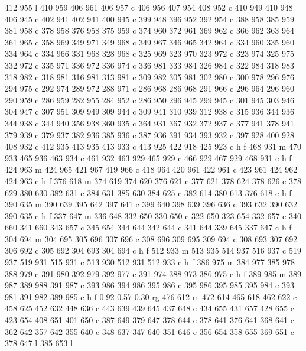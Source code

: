 {{   412 955 l
   410 959 406 961 406 957 c
   406 956 407 954 408 952 c
   410 949 410 948 406 945 c
   402 941 402 941 400 945 c
   399 948 396 952 392 954 c
   388 958 385 959 381 958 c
   378 958 376 958 375 959 c
   374 960 372 961 369 962 c
   366 962 363 964 361 965 c
   358 969 349 971 349 968 c
   349 967 346 965 342 964 c
   334 960 335 960 334 964 c
   334 966 331 968 328 968 c
   325 969 323 970 323 972 c
   323 974 325 975 332 972 c
   335 971 336 972 336 974 c
   336 981 333 984 326 984 c
   322 984 318 983 318 982 c
   318 981 316 981 313 981 c
   309 982 305 981 302 980 c
   300 978 296 976 294 975 c
   292 974 289 972 288 971 c
   286 968 286 968 291 966 c
   296 964 296 960 290 959 c
   286 959 282 955 284 952 c
   286 950 296 945 299 945 c
   301 945 303 946 304 947 c
   307 951 309 949 309 944 c
   309 941 310 939 312 938 c
   315 936 344 936 344 938 c
   344 940 356 938 360 935 c
   364 931 367 932 372 937 c
   377 941 378 941 379 939 c
   379 937 382 936 385 936 c
   387 936 391 934 393 932 c
   397 928 400 928 408 932 c
   412 935 413 935 413 933 c
   413 925 422 918 425 923 c
   h f
   468 931 m
   470 933 465 936 463 934 c
   461 932 463 929 465 929 c
   466 929 467 929 468 931 c
   h f
   424 963 m
   424 965 421 967 419 966 c
   418 964 420 961 422 961 c
   423 961 424 962 424 963 c
   h f
   376 618 m
   374 619 374 620 376 621 c
   377 621 378 624 378 626 c
   378 629 380 630 382 631 c
   384 631 385 630 384 625 c
   382 614 380 613 376 618 c
   h f
   390 635 m
   390 639 395 642 397 641 c
   399 640 398 639 396 636 c
   393 632 390 632 390 635 c
   h f
   337 647 m
   336 648 332 650 330 650 c
   322 650 323 654 332 657 c
   340 660 341 660 343 657 c
   345 654 344 644 342 644 c
   341 644 339 645 337 647 c
   h f
   304 694 m
   304 695 305 696 307 696 c
   308 696 309 695 309 694 c
   308 693 307 692 306 692 c
   305 692 304 693 304 694 c
   h f
   512 933 m
   513 935 514 937 516 937 c
   519 937 519 931 515 931 c
   513 930 512 931 512 933 c
   h f
   386 975 m
   384 977 385 978 388 979 c
   391 980 392 979 392 977 c
   391 974 388 973 386 975 c
   h f
   389 985 m
   389 987 389 988 391 987 c
   393 986 394 986 395 986 c
   395 986 395 985 395 984 c
   393 981 391 982 389 985 c
   h f
   0.92 0.57 0.30 rg
   476 612 m
   472 614 465 618 462 622 c
   458 625 452 632 448 636 c
   443 639 439 645 437 648 c
   434 655 431 657 428 655 c
   423 654 408 651 401 650 c
   387 649 379 647 378 644 c
   378 641 376 641 368 641 c
   362 642 357 642 355 640 c
   348 637 347 640 351 646 c
   356 654 358 655 369 651 c
   378 647 l
   385 653 l
}}
